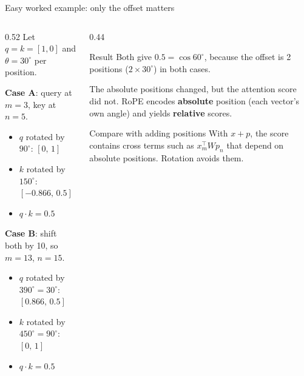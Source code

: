 \documentclass[aspectratio=169,11pt]{beamer}
\begin{document}
\begin{frame}{Easy worked example: only the offset matters}
  \begin{columns}[T]
    \begin{column}{0.52\textwidth}
      \small
      Let $q=k=[1,0]$ and $\theta=30^\circ$ per position.
      \vspace{1mm}

      \textbf{Case A}: query at $m=3$, key at $n=5$.
      \begin{itemize}
        \item $q$ rotated by $90^\circ$: $[0,\,1]$
        \item $k$ rotated by $150^\circ$: $[-0.866,\,0.5]$
        \item $q\cdot k = 0.5$
      \end{itemize}
      \textbf{Case B}: shift both by 10, so $m=13$, $n=15$.
      \begin{itemize}
        \item $q$ rotated by $390^\circ=30^\circ$: $[0.866,\,0.5]$
        \item $k$ rotated by $450^\circ=90^\circ$: $[0,\,1]$
        \item $q\cdot k = 0.5$
      \end{itemize}
    \end{column}
    \begin{column}{0.44\textwidth}
      \begin{exampleblock}{Result}
        \small
        Both give $0.5=\cos 60^\circ$, because the offset is 2 positions ($2\times30^\circ$) in both cases.
        \vspace{1mm}

        The absolute positions changed, but the attention score did not. RoPE encodes \textbf{absolute} position (each vector's own angle) and yields \textbf{relative} scores.
      \end{exampleblock}
      \begin{alertblock}{Compare with adding positions}
        \small
        With $x+p$, the score contains cross terms such as $x_m^\top W p_n$ that depend on absolute positions. Rotation avoids them.
      \end{alertblock}
    \end{column}
  \end{columns}
\end{frame}
\end{document}
